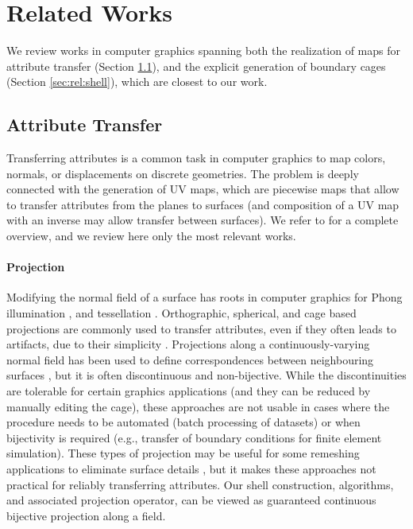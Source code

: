 
\section{Related Works}
\label{sec:related}
We review works in computer graphics spanning both the realization of maps for attribute transfer (Section \ref{sec:rel:transfer}), and the explicit generation of boundary cages (Section \ref{sec:rel:shell}), which are closest to our work.

\subsection{Attribute Transfer}
\label{sec:rel:transfer}

Transferring attributes is a common task in computer graphics to map colors, normals, or displacements on discrete geometries. 
The problem is deeply connected with the generation of UV maps, which are piecewise maps that allow to transfer attributes from the planes to surfaces (and composition of a UV map with an inverse may allow transfer between surfaces).  We refer to \cite{FloaterSurvey:2005,Sheffer:2006,Hormann:2007} for a complete overview, and we review here only the most relevant works.

\paragraph{Projection} 
Modifying the normal field of a surface has roots in computer graphics for Phong illumination \cite{phong1975illumination}, and tessellation \cite{boubekeur2008phong}.  Orthographic, spherical, and cage based projections are commonly used to transfer attributes, even if they often leads to artifacts, due to their simplicity {\cite{blender,nguyen2007gpu}}. 
Projections along a continuously-varying normal field has been used to define correspondences between neighbouring surfaces \cite{kobbelt1998interactive,lee2000displaced,panozzo2013weighted,Ezuz:2019}, but it is often discontinuous and non-bijective. While the discontinuities are tolerable for certain graphics applications (and they can be reduced by manually editing the cage), these approaches are not usable in cases where the procedure needs to be automated (batch processing of datasets) or when bijectivity is required (e.g., transfer of boundary conditions for finite element simulation).  These types of projection may be useful for some remeshing applications to eliminate surface details \cite{ebke2014level}, but it makes these approaches not practical for reliably transferring attributes. Our shell construction, algorithms, and associated projection operator, can be viewed as guaranteed continuous bijective  projection along a field. 

